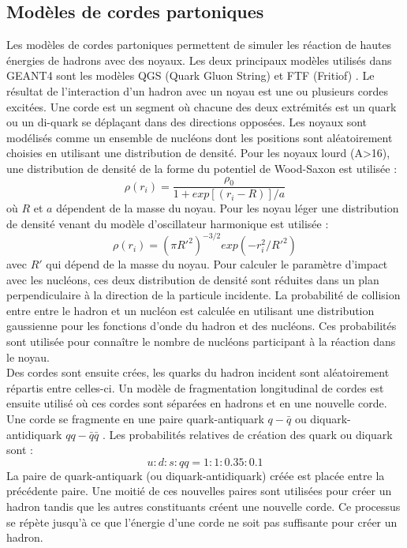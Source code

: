 \subsection{Modèles de cordes partoniques}
\label{sec.parton}
Les modèles de cordes partoniques permettent de simuler les réaction de hautes énergies de hadrons avec des noyaux. Les deux principaux modèles utilisés dans GEANT4 sont les modèles QGS (Quark Gluon String) et FTF (Fritiof) \cite{geant4_parton}. Le résultat de l'interaction d'un hadron avec un noyau est une ou plusieurs cordes excitées. Une corde est un segment où chacune des deux extrémités est un quark ou un di-quark se déplaçant dans des directions opposées. Les noyaux sont modélisés comme un ensemble de nucléons dont les positions sont aléatoirement choisies en utilisant une distribution de densité. Pour les noyaux lourd (A>16), une distribution de densité de la forme du potentiel de Wood-Saxon est utilisée : 
\begin{equation}
  \rho(r_i)=\frac{\rho_0}{1+exp[(r_i-R)]/a}
\end{equation}
où $R$ et $a$ dépendent de la masse du noyau. Pour les noyau léger une distribution de densité venant du modèle d'oscillateur harmonique est utilisée : 
\begin{equation}
  \rho(r_i)=(\pi R'^2)^{-3/2}exp(-r_i^2/R'^2)
\end{equation}
avec $R'$  qui dépend de la masse du noyau.
Pour calculer le paramètre d'impact avec les nucléons, ces deux distribution de densité sont réduites dans un plan perpendiculaire à la direction de la particule incidente. La probabilité de collision entre entre le hadron et un nucléon est calculée en utilisant une distribution gaussienne pour les fonctions d'onde du hadron et des nucléons. Ces probabilités sont utilisée pour connaître le nombre de nucléons participant à la réaction dans le noyau.\\
Des cordes sont ensuite crées, les quarks du hadron incident sont aléatoirement répartis entre celles-ci. Un modèle de fragmentation longitudinal de cordes est ensuite utilisé où ces cordes sont séparées en hadrons et en une nouvelle corde. Une corde se fragmente en une paire quark-antiquark $q-\bar q$ ou diquark-antidiquark $qq-\bar q \bar q$ \cite{geant4_reference}. Les probabilités relatives de création des quark ou diquark sont :
\begin{equation}
  u:d:s:qq = 1:1:0.35:0.1
\end{equation}
La paire de quark-antiquark (ou diquark-antidiquark) créée est placée entre la précédente paire. Une moitié de ces nouvelles paires sont utilisées pour créer un hadron tandis que les autres constituants créent une nouvelle corde. Ce processus se répète jusqu'à ce que l'énergie d'une corde ne soit pas suffisante pour créer un hadron.\\
